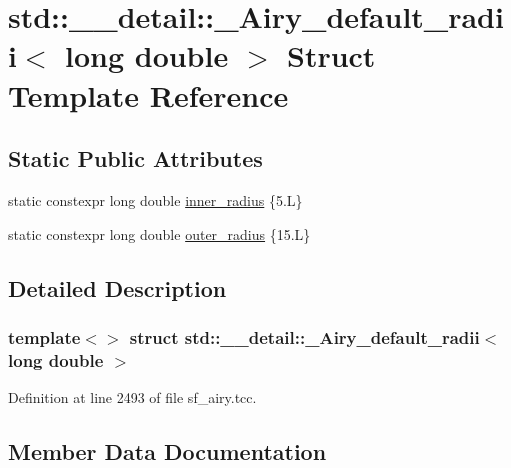\hypertarget{structstd_1_1____detail_1_1__Airy__default__radii_3_01long_01double_01_4}{}\section{std\+:\+:\+\_\+\+\_\+detail\+:\+:\+\_\+\+Airy\+\_\+default\+\_\+radii$<$ long double $>$ Struct Template Reference}
\label{structstd_1_1____detail_1_1__Airy__default__radii_3_01long_01double_01_4}
\subsection*{Static Public Attributes}
\begin{DoxyCompactItemize}
\item 
static constexpr long double \hyperlink{structstd_1_1____detail_1_1__Airy__default__radii_3_01long_01double_01_4_a59d4d304728aa4ac3669fc967a9e69a9}{inner\+\_\+radius} \{5.\+L\}
\item 
static constexpr long double \hyperlink{structstd_1_1____detail_1_1__Airy__default__radii_3_01long_01double_01_4_ab46784c2c76dc0f43aeb85d22f8b21a7}{outer\+\_\+radius} \{15.\+L\}
\end{DoxyCompactItemize}


\subsection{Detailed Description}
\subsubsection*{template$<$$>$\newline
struct std\+::\+\_\+\+\_\+detail\+::\+\_\+\+Airy\+\_\+default\+\_\+radii$<$ long double $>$}



Definition at line 2493 of file sf\+\_\+airy.\+tcc.



\subsection{Member Data Documentation}
\mbox{\label{structstd_1_1____detail_1_1__Airy__default__radii_3_01long_01double_01_4_a59d4d304728aa4ac3669fc967a9e69a9}} 
